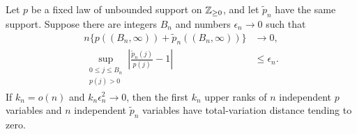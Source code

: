 \begin{lemma}\label{lem:censor}
Let $p$ be a fixed law of unbounded support on $\mathbb Z_{\ge0}$, and let $\widetilde p_n$ have the same support. Suppose there are integers $B_n$ and numbers $\epsilon_n\to0$ such that
\begin{align}
 n\{p((B_n,\infty))+\widetilde p_n((B_n,\infty))\}&\to0,\label{eq:overflow}\\
 \sup_{\substack{0\le j\le B_n\\p(j)>0}}
 \left|\frac{\widetilde p_n(j)}{p(j)}-1\right|&\le\epsilon_n.\label{eq:relative}
\end{align}
If $k_n=o(n)$ and $k_n\epsilon_n^2\to0$, then the first $k_n$ upper ranks of $n$ independent $p$ variables and $n$ independent $\widetilde p_n$ variables have total-variation distance tending to zero.
\end{lemma}
